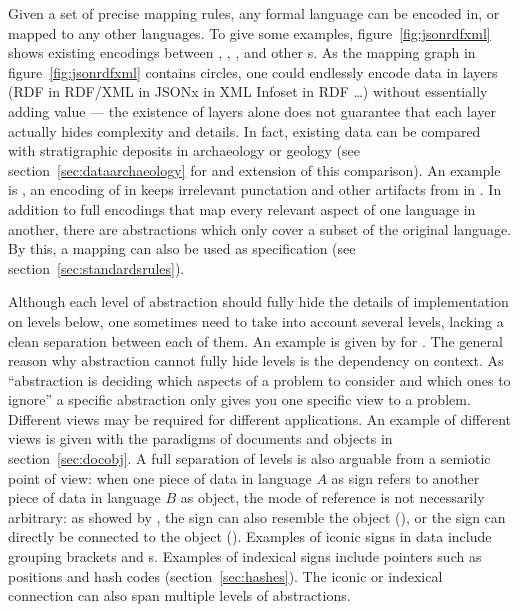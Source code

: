 Given a set of precise mapping rules, any formal language can be encoded in, or
mapped to any other languages. To give some examples,
figure~\ref{fig:jsonrdfxml} shows existing encodings between ,
, , and other s. As the
mapping graph in figure~\ref{fig:jsonrdfxml} contains circles, one could
endlessly encode data in layers (RDF in RDF/XML in JSONx in XML Infoset in RDF
\ldots) without essentially adding value --- the existence of layers alone does
not guarantee that each layer actually hides complexity and details. In fact,
existing data can be compared with stratigraphic deposits in archaeology or
geology (see section~\ref{sec:dataarchaeology} for and extension of this
comparison). An example is , an encoding of  in
 keeps irrelevant punctation and other artifacts from  in
. In addition to full encodings that map every relevant aspect of
one language in another, there are abstractions which only cover a subset of
the original language. By this, a mapping can also be used as specification
(see section~\ref{sec:standardsrules}).


Although each level of abstraction should fully hide the details of
implementation on levels below, one sometimes need to take into account several
levels, lacking a clean separation between each of them. An example is given by
\textcite{Thomale2010} for . The general reason why abstraction
cannot fully hide levels is the dependency on context. As ``abstraction is
deciding which aspects of a problem to consider and which ones to ignore''
\cite{Koenig1998} a specific abstraction only gives you one specific view to a
problem. Different views may be required for different applications. An
example of different views is given with the paradigms of documents and objects
in section~\ref{sec:docobj}.  A full separation of levels is also arguable from a
semiotic point of view: when one piece of data in language $A$ as sign refers
to another piece of data in language $B$ as object, the mode of reference is
not necessarily arbitrary: as showed by , the
sign can also resemble the object (), or the sign can
directly be connected to the object ().  Examples of iconic
signs in data include grouping brackets and s. 
Examples of indexical signs include pointers such as positions and hash codes
(section~\ref{sec:hashes}).  The iconic or indexical connection can also span
multiple levels of abstractions.

